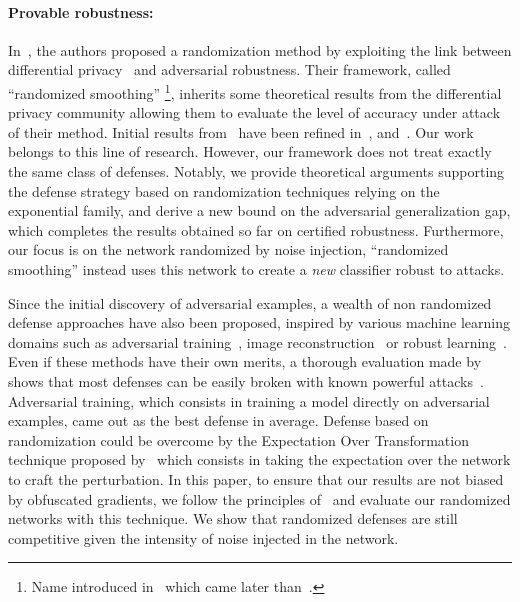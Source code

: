 \paragraph{Provable robustness:}
In~\cite{lecuyer2018certified}, the authors proposed a randomization method by exploiting the link between differential privacy~\cite{dwork2014algorithmic} and adversarial robustness.
Their framework, called ``randomized smoothing'' \footnote{Name introduced in~\cite{cohen2019certified} which came later than~\cite{lecuyer2018certified}.}, inherits some theoretical results from the differential privacy community allowing them to evaluate the level of accuracy under attack of their method.
Initial results from~\cite{lecuyer2018certified} have been refined in~\cite{li2018second}, and~\cite{cohen2019certified}.
Our work belongs to this line of research.
However, our framework does not treat exactly the same class of defenses.
Notably, we provide theoretical arguments supporting the defense strategy based on randomization techniques relying on the exponential family, and derive a new bound on the adversarial generalization gap, which completes the results obtained so far on certified robustness.
Furthermore, our focus is on the network randomized by noise injection, ``randomized smoothing'' instead uses this network to create a \emph{new} classifier robust to attacks.

Since the initial discovery of adversarial examples, a wealth of non randomized defense approaches have also been proposed, inspired by various machine learning domains such as adversarial training~\cite{goodfellow2014explaining,madry2018towards}, image reconstruction~\cite{meng2017magnet,samangouei2018defense} or robust learning~\cite{goodfellow2014explaining,madry2018towards}.
Even if these methods have their own merits, a thorough evaluation made by~\cite{athalye2018obfuscated} shows that most defenses can be easily broken with known powerful attacks~\cite{madry2018towards,carlini2017towards,chen2018ead}.
Adversarial training, which consists in training a model directly on adversarial examples, came out as the best defense in average.
Defense based on randomization could be overcome by the Expectation Over Transformation technique proposed by~\cite{athalye2017synthesizing} which consists in taking the expectation over the network to craft the perturbation.
In this paper, to ensure that our results are not biased by obfuscated gradients, we follow the principles of~\cite{athalye2018obfuscated,carlini2019evaluating} and evaluate our randomized networks with this technique.
We show that randomized defenses are still competitive given the intensity of noise injected in the network. 

